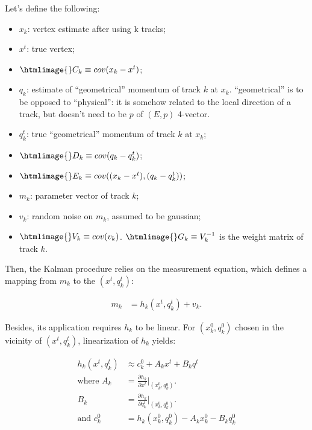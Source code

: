 \documentclass[12pt,final]{article}
\begin{document}
Let's define the following:
\begin{itemize}
\item $x_k$: vertex estimate after using k tracks;
\item $x^t$: true vertex;
\item $\htmlimage{}C_k\equiv cov(x_k-x^t)$;
\item $q_k$: estimate of ``geometrical'' momentum of track $k$ at $x_k$.  ``geometrical''  is to be opposed to 
``physical'': it is somehow related to the local direction of a track, but doesn't need 
to be $p$ of $(E,p)$ 4-vector.
\item   $q^t_k$: true ``geometrical'' momentum of track $k$ at $x_k$;
\item $\htmlimage{}D_k\equiv cov(q_k - q^t_k)$;
\item $\htmlimage{}E_k\equiv cov((x_k-x^t) , (q_k-q^t_k))$;
\item $m_k$: parameter vector of track $k$;
\item $v_k$: random noise on  $m_k$, assumed to be gaussian;
\item $\htmlimage{}V_k\equiv cov(v_k)$. $\htmlimage{}G_k\equiv V_k^{-1}$ is the weight matrix of track $k$. 
\end{itemize}

Then, the Kalman procedure relies on the measurement equation, which defines a mapping from $m_k$
 to the $(x^t,q^t_k)$:

\begin{equation}
\begin{aligned}
m_k &= h_k(x^t,q^t_k) + v_k.
\end{aligned}
\end{equation}

Besides, its application requires $h_k$ to be linear. For $(x^0_k,q^0_k)$ chosen in the 
vicinity of $(x^t,q^t_k)$, linearization of $h_k$ yields:

\begin{equation}
\begin{aligned}
h_k(x^t,q^t_k) &\approx c^0_k + A_k x^t + B_k q^t \\
\text{where } A_k &= \frac{\partial h_k}{\partial x^t}\biggl\lvert_{(x^0_k,q^0_k)}\biggr.\\
              B_k &= \frac{\partial h_k}{\partial q^t_k}\biggl\lvert_{(x^0_k,q^0_k)}\biggr.\\
\text{and } c^0_k &= h_k(x^0_k,q^0_k) - A_k x^0_k- B_k q^0_k
\end{aligned}
\end{equation}
\end{document}
